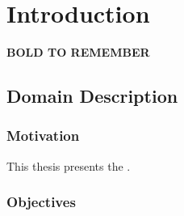 \chapter{Introduction}
\label{chapter:intro}


\textbf{BOLD TO REMEMBER}\\

\section{Domain Description}
\label{sec:domain}

\subsection{Motivation}
\label{sub-sec:motivation}

This thesis presents the \textbf{\project}.
\newline
{}

\subsection{Objectives}


